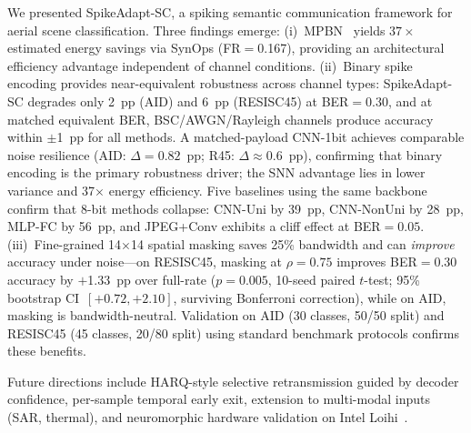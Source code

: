 \documentclass[conference]{IEEEtran}
\begin{document}
We presented SpikeAdapt-SC, a spiking semantic communication framework for aerial scene classification. Three findings emerge: (i)~MPBN~\cite{guo2023mpbn} yields $37{\times}$ estimated energy savings via SynOps (FR$=$0.167), providing an architectural efficiency advantage independent of channel conditions. (ii)~Binary spike encoding provides near-equivalent robustness across channel types: SpikeAdapt-SC degrades only 2~pp (AID) and 6~pp (RESISC45) at BER${=}0.30$, and at matched equivalent BER, BSC/AWGN/Rayleigh channels produce accuracy within $\pm$1~pp for all methods. A matched-payload CNN-1bit achieves comparable noise resilience (AID: $\Delta{=}0.82$~pp; R45: $\Delta{\approx}0.6$~pp), confirming that binary encoding is the primary robustness driver; the SNN advantage lies in lower variance and 37$\times$ energy efficiency. Five baselines using the same backbone confirm that 8-bit methods collapse: CNN-Uni by 39~pp, CNN-NonUni by 28~pp, MLP-FC by 56~pp, and JPEG+Conv exhibits a cliff effect at BER${=}0.05$. (iii)~Fine-grained 14$\times$14 spatial masking saves 25\% bandwidth and can \emph{improve} accuracy under noise---on RESISC45, masking at $\rho{=}0.75$ improves BER${=}0.30$ accuracy by $+$1.33~pp over full-rate ($p{=}0.005$, 10-seed paired $t$-test; 95\% bootstrap CI~$[+0.72, +2.10]$, surviving Bonferroni correction), while on AID, masking is bandwidth-neutral. Validation on AID (30 classes, 50/50 split) and RESISC45 (45 classes, 20/80 split) using standard benchmark protocols confirms these benefits.

Future directions include HARQ-style selective retransmission guided by decoder confidence, per-sample temporal early exit, extension to multi-modal inputs (SAR, thermal), and neuromorphic hardware validation on Intel Loihi~\cite{davies2018loihi}.


\end{document}
